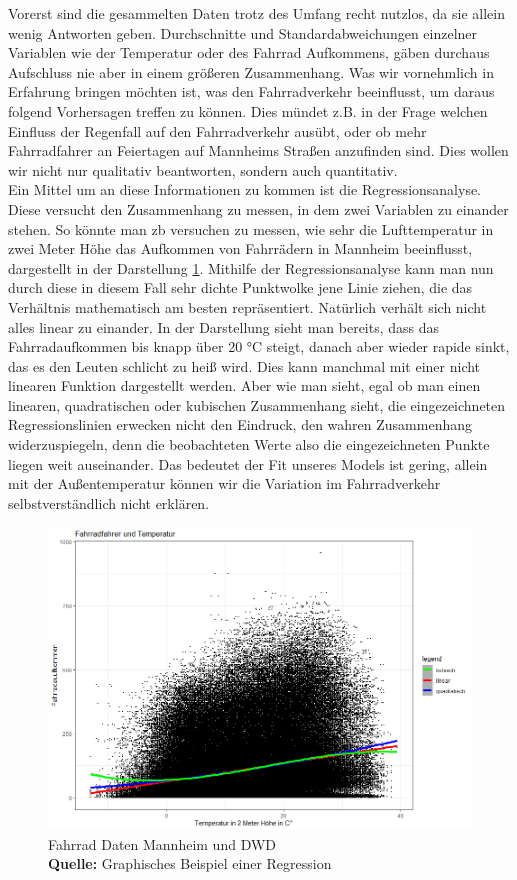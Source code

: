 \documentclass[a4paper,12pt]{thesis}
\newcommand*{\captionsource}[2]{%
	\caption[{#1}]{%
		#1%
		\\\hspace{\linewidth}%
		\textbf{Quelle:} #2%
	}%
}
\begin{document}
Vorerst sind die gesammelten Daten trotz des Umfang recht nutzlos, da sie allein wenig Antworten geben. Durchschnitte und Standardabweichungen einzelner Variablen wie der Temperatur oder des Fahrrad Aufkommens, gäben durchaus Aufschluss nie aber in einem größeren Zusammenhang. Was wir vornehmlich in Erfahrung bringen möchten ist, was den Fahrradverkehr beeinflusst, um daraus folgend Vorhersagen treffen zu können. Dies mündet z.B. in der Frage welchen Einfluss der Regenfall auf den Fahrradverkehr ausübt, oder ob mehr Fahrradfahrer an Feiertagen auf Mannheims Straßen anzufinden sind. Dies wollen wir nicht nur qualitativ beantworten, sondern auch quantitativ.\\

Ein Mittel um an diese Informationen zu kommen ist die Regressionsanalyse. Diese versucht den Zusammenhang zu messen, in dem zwei Variablen zu einander stehen. So könnte man zb versuchen zu messen, wie sehr die Lufttemperatur in zwei Meter Höhe das Aufkommen von Fahrrädern in Mannheim beeinflusst, dargestellt in der Darstellung \ref{fig:BSP}. Mithilfe der Regressionsanalyse kann man nun durch diese in diesem Fall sehr dichte Punktwolke jene Linie ziehen, die das Verhältnis mathematisch am besten repräsentiert. Natürlich verhält sich nicht alles linear zu einander. In der Darstellung sieht man bereits, dass das Fahrradaufkommen bis knapp über 20 °C steigt, danach aber wieder rapide sinkt, das es den Leuten schlicht zu heiß wird. Dies kann manchmal mit einer nicht linearen Funktion dargestellt werden. Aber wie man sieht, egal ob man einen linearen, quadratischen oder kubischen Zusammenhang sieht, die eingezeichneten Regressionslinien erwecken nicht den Eindruck, den wahren Zusammenhang widerzuspiegeln, denn die beobachteten Werte also die eingezeichneten Punkte liegen weit auseinander. Das bedeutet der Fit unseres Models ist gering, allein mit der Außentemperatur können wir die Variation im Fahrradverkehr selbstverständlich nicht erklären.\\

\begin{figure}[!ht]
	\centering
	\includegraphics[width=\textwidth]{Plots/Regression_Bsp.png}
	\captionsource{Fahrrad Daten Mannheim und DWD}{
		Graphisches Beispiel einer Regression
	}
	\label{fig:BSP}
\end{figure}
\end{document}
